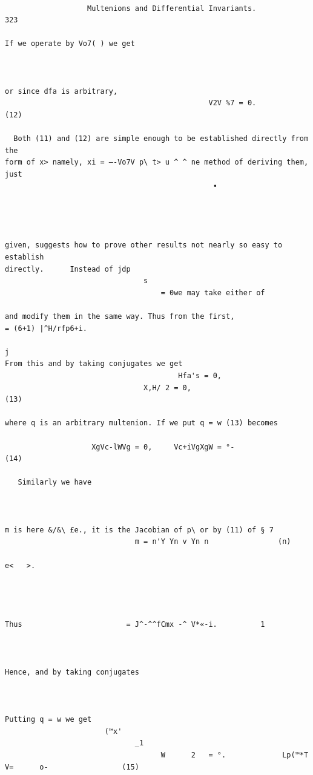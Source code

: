 \documentclass[10pt]{article}
\begin{document}
\begin{verbatim}

                   Multenions and Differential Invariants.                                                     323

If we operate by Vo7( ) we get



or since dfa is arbitrary,
                                               V2V %7 = 0.                                                      (12)

  Both (11) and (12) are simple enough to be established directly from the
form of x> namely, xi = —-Vo7V p\ t> u ^ ^ ne method of deriving them, just
                                                •




given, suggests how to prove other results not nearly so easy to establish
directly.      Instead of jdp
                                s
                                    = 0we may take either of

and modify them in the same way. Thus from the first,                                            = (6+1) |^H/rfp6+i.
                                                                                                          j
From this and by taking conjugates we get
                                        Hfa's = 0,
                                X,H/ 2 = 0,                                                                     (13)

where q is an arbitrary multenion. If we put q = w (13) becomes

                    XgVc-lWVg = 0,     Vc+iVgXgW = °-                                                           (14)

   Similarly we have



m is here &/&\ £e., it is the Jacobian of p\ or by (11) of § 7
                              m = n'Y Yn v Yn n                (n)
                                                                           e<   >.




Thus                        = J^-^^fCmx -^ V*«-i.          1



Hence, and by taking conjugates



Putting q = w we get
                       (™x'
                              _1
                                    W      2   = °.             Lp(™*T               V=      o-                 (15)




\end{verbatim}
\end{document}
